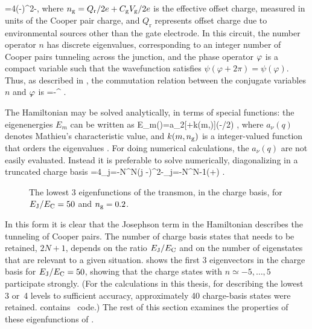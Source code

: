 \be
    \label{eq:hamcpb2}
    =4\EC(\nh-\ngate)^2-\EJ\cos\vph ,
\ee%
%
where $n_{\text{g}}=Q_\text{r}/2e+C_{\text{g}}V_{\text{g}}/2e$ is the effective offset charge, measured  in units of the Cooper pair charge, and $Q_{\text{r}}$ represents offset charge due to environmental sources other than the gate electrode. In this circuit, the number operator $n$ has discrete eigenvalues, corresponding to an integer number of Cooper pairs tunneling across the junction, and the phase operator ${\varphi}$ is a compact variable such that the wavefunction satisfies $\psi(\varphi+2\pi)=\psi(\varphi)$. Thus, as described in , the commutation relation between the conjugate variables $n$ and ${\varphi}$ is
\be
    \label{eq:commnphi}
    =-\rme^{\rmi \vph} .
\ee

The Hamiltonian  may be solved analytically, in terms of special functions: the eigenenergies $E_m$ can be written as
\be
    \label{eq:mathieu}
    E_m(\ngate)=\EC a_{2[\ngate+k(m,\ngate)]}(-\EJ/2\EC) ,
\ee%
%
%
where $a_\nu(q)$ denotes Mathieu's characteristic value, and $k(m,n_{\text{g}})$ is a integer-valued function that orders the eigenvalues \cite{koch_charge-insensitive_2007,cottetthesis}. For doing numerical calculations, the $a_\nu(q)$ are not easily evaluated. Instead it is preferable to solve  numerically, diagonalizing in a truncated charge basis
\be
    \label{eq:chargebasis}
    =4\EC\sum_{j=-N}^{N}(j -\ngate)^2-\EJ\sum_{j=-N}^{N-1}\bigl(+\bigr) .
\ee
\begin{figure}
 \centering
 \caption[Transmon wavefunctions]{ The lowest 3 eigenfunctions of the transmon, in the charge basis, for $E_{\text{J}}/E_{\text{C}}=50$ and $n_{\text{g}}=0.2$.\label{fig:wavefunctions}}
\end{figure}%
In this form it is clear that the Josephson term in the Hamiltonian describes the tunneling of Cooper pairs. The number of charge basis states that needs to be retained, $2N+1$, depends on the ratio $E_{\text{J}}/E_{\text{C}}$ and on the number of eigenstates that are relevant to a given situation.  shows the first 3 eigenvectors in the charge basis for $E_{\text{J}}/E_{\text{C}}=50$, showing that the charge states with $n\simeq-5,\ldots,5$ participate strongly. (For the calculations in this thesis, for describing the lowest 3 or~4 levels to sufficient accuracy, approximately 40 charge-basis states were retained.  contains \mma\ code.) The rest of this section examines the properties of these eigenfunctions of .

